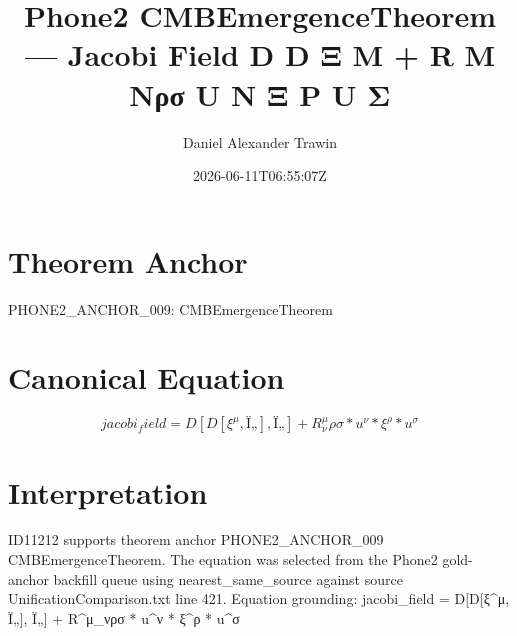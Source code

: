 \documentclass[11pt]{article}
\title{Phone2 CMBEmergenceTheorem — Jacobi Field D D Ξ Μ + R Μ Νρσ U Ν Ξ Ρ U Σ}
\author{Daniel Alexander Trawin}
\date{2026-06-11T06:55:07Z}
\begin{document}
\maketitle
\section*{Theorem Anchor}
PHONE2_ANCHOR_009: CMBEmergenceTheorem
\section*{Canonical Equation}
\[
jacobi_field = D[D[ξ^μ, Ï„], Ï„] + R^μ_νρσ * u^ν * ξ^ρ * u^σ
\]
\section*{Interpretation}
ID11212 supports theorem anchor PHONE2_ANCHOR_009 CMBEmergenceTheorem. The equation was selected from the Phone2 gold-anchor backfill queue using nearest_same_source against source UnificationComparison.txt line 421. Equation grounding: jacobi_field = D[D[ξ^μ, Ï„], Ï„] + R^μ_νρσ * u^ν * ξ^ρ * u^σ
\end{document}
